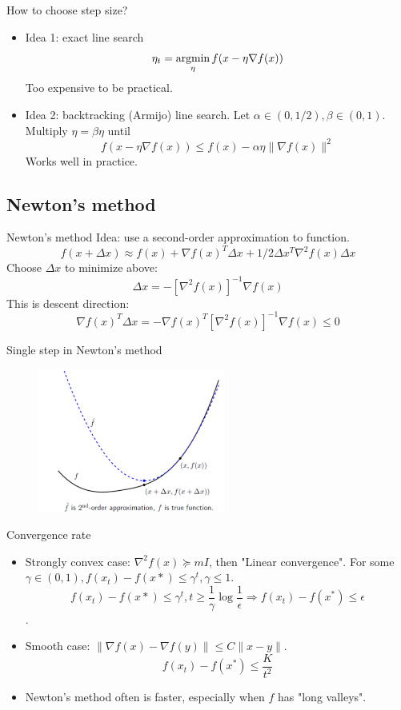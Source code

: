 \documentclass[draft]{beamer}
\begin{document}
\begin{frame}
	{How to choose step size?} 
	\begin{itemize}
		\item Idea 1: exact line search 
		\[\eta_t = \mathop{\mathrm{argmin}}_\eta f(x- \eta \nabla f(x) ) \] 
		Too expensive to be practical. 
		\item Idea 2: backtracking (Armijo) line search. Let $\alpha \in (0,1/2), \beta \in (0,1)$. Multiply $\eta = \beta \eta $ until 
		\[f(x-\eta \nabla f(x)) \le f(x) -\alpha \eta \| \nabla f(x)\|^2 \] 
		Works well in practice. 
	\end{itemize}
\end{frame}

\subsection{Newton's method} 
\begin{frame}{Newton's method} 
	Idea: use a second-order approximation to function. 
	\[f(x+\Delta x) \approx f(x)+\nabla f(x)^T \Delta x + 1/2 \Delta x^T \nabla^2 f(x) \Delta x \] 
	Choose $\Delta x $ to minimize above: 
	\[\Delta x = - [ \nabla^2 f(x)]^{-1} \nabla f(x) \] 
	This is descent direction: 
	\[\nabla f(x)^T \Delta x = - \nabla f(x)^T [ \nabla^2 f(x)]^{-1} \nabla f(x)  \le 0  \]
\end{frame}

\begin{frame}
	{Single step in Newton's method} 
	\begin{figure}
		\includegraphics[width=0.55\textwidth]{2018-03-05-12-44-34.png}
		\end{figure}
\end{frame}

\begin{frame}
	{Convergence rate} 
	\begin{itemize}
		\item Strongly convex case: $\nabla^2f(x) \succeq  mI $, then "Linear convergence". For some $\gamma\in (0,1), f(x_t) - f(x*) \le \gamma^t , \gamma \le 1 $. 
		\[f(x_t) - f(x*) \le \gamma^t, t \ge \frac{1}{\gamma} \log \frac{1}{\epsilon} \Rightarrow f(x_t ) - f(x^* ) \le \epsilon \]. 
		\item Smooth case: $\|\nabla f(x) - \nabla f(y) \| \le C \| x-y \|$. 
		\[ f(x_t) - f(x^*) \le \frac{K}{t^2} \]
		\item Newton's method often is faster, especially when $f$ has "long valleys". 
	\end{itemize}
\end{frame}
\end{document}
